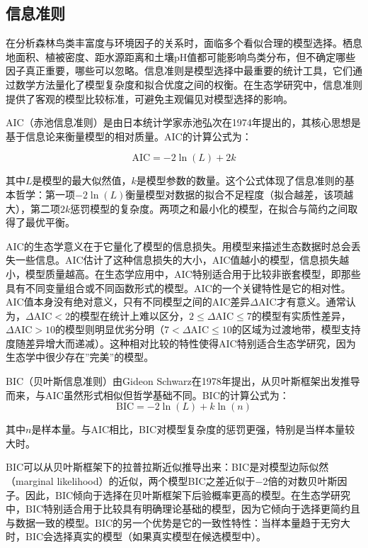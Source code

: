 \documentclass[
  twoside,12pt,fontset=none]{ctexbook}
\begin{document}
\hypertarget{ux4fe1ux606fux51c6ux5219}{%
\subsection{信息准则}\label{ux4fe1ux606fux51c6ux5219}}

在分析森林鸟类丰富度与环境因子的关系时，面临多个看似合理的模型选择。栖息地面积、植被密度、距水源距离和土壤pH值都可能影响鸟类分布，但不确定哪些因子真正重要，哪些可以忽略。信息准则是模型选择中最重要的统计工具，它们通过数学方法量化了模型复杂度和拟合优度之间的权衡。在生态学研究中，信息准则提供了客观的模型比较标准，可避免主观偏见对模型选择的影响。

AIC（赤池信息准则）是由日本统计学家赤池弘次在1974年提出的，其核心思想是基于信息论来衡量模型的相对质量。AIC的计算公式为：

\[\text{AIC} = -2 \ln(L) + 2k\]

其中\(L\)是模型的最大似然值，\(k\)是模型参数的数量。这个公式体现了信息准则的基本哲学：第一项\(-2\ln(L)\)衡量模型对数据的拟合不足程度（拟合越差，该项越大），第二项\(2k\)惩罚模型的复杂度。两项之和最小化的模型，在拟合与简约之间取得了最优平衡。

\(\text{AIC}\)的生态学意义在于它量化了模型的信息损失。用模型来描述生态数据时总会丢失一些信息。\(\text{AIC}\)估计了这种信息损失的大小，\(\text{AIC}\)值越小的模型，信息损失越小，模型质量越高。在生态学应用中，\(\text{AIC}\)特别适合用于比较非嵌套模型，即那些具有不同变量组合或不同函数形式的模型。\(\text{AIC}\)的一个关键特性是它的相对性。\(\text{AIC}\)值本身没有绝对意义，只有不同模型之间的\(\text{AIC}\)差异\(\Delta\text{AIC}\)才有意义。通常认为，\(\Delta\text{AIC} < 2\)的模型在统计上难以区分，\(2 \leq \Delta\text{AIC} \leq 7\)的模型有实质性差异，\(\Delta\text{AIC} > 10\)的模型则明显优劣分明（\(7 < \Delta\text{AIC} \leq 10\)的区域为过渡地带，模型支持度随差异增大而递减）。这种相对比较的特性使得\(\text{AIC}\)特别适合生态学研究，因为生态学中很少存在''完美''的模型。

BIC（贝叶斯信息准则）由Gideon Schwarz在1978年提出，从贝叶斯框架出发推导而来，与AIC虽然形式相似但哲学基础不同。BIC的计算公式为：
\[\text{BIC} = -2 \ln(L) + k \ln(n)\]

其中\(n\)是样本量。与AIC相比，BIC对模型复杂度的惩罚更强，特别是当样本量较大时。

\(\text{BIC}\)可以从贝叶斯框架下的拉普拉斯近似推导出来：BIC是对模型边际似然（marginal likelihood）的近似，两个模型BIC之差近似于\(-2\)倍的对数贝叶斯因子。因此，\(\text{BIC}\)倾向于选择在贝叶斯框架下后验概率更高的模型。在生态学研究中，\(\text{BIC}\)特别适合用于比较具有明确理论基础的模型，因为它倾向于选择更简约且与数据一致的模型。\(\text{BIC}\)的另一个优势是它的一致性特性：当样本量趋于无穷大时，\(\text{BIC}\)会选择真实的模型（如果真实模型在候选模型中）。
\end{document}
